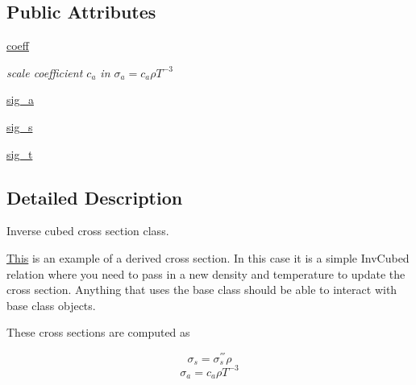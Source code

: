 \subsection*{Public Attributes}
\begin{DoxyCompactItemize}
\item 
\hyperlink{classsrc_1_1_cross_x_interface_1_1_inv_cubed_cross_x_a683c89e90662ba53f43be1061d4e39aa}{coeff}
\begin{DoxyCompactList}\small\item\em scale coefficient $c_a$ in $\sigma_a = c_a \rho T^{-3}$ \end{DoxyCompactList}\item 
\hyperlink{classsrc_1_1_cross_x_interface_1_1_inv_cubed_cross_x_ab19871ffd067470950336cff88f8b1da}{sig\-\_\-a}
\item 
\hyperlink{classsrc_1_1_cross_x_interface_1_1_inv_cubed_cross_x_afb10e3cd4777a9b381a31a32071fc0d1}{sig\-\_\-s}
\item 
\hyperlink{classsrc_1_1_cross_x_interface_1_1_inv_cubed_cross_x_a9aa02ff48c273c3bc0a8213a045e6f4e}{sig\-\_\-t}
\end{DoxyCompactItemize}


\subsection{Detailed Description}
Inverse cubed cross section class. 

\hyperlink{namespace_this}{This} is an example of a derived cross section. In this case it is a simple Inv\-Cubed relation where you need to pass in a new density and temperature to update the cross section. Anything that uses the base class should be able to interact with base class objects.

These cross sections are computed as

\[ \sigma_s = \sigma_s^{'''} \rho \] \[ \sigma_a = c_a \rho T^{-3} \] 

